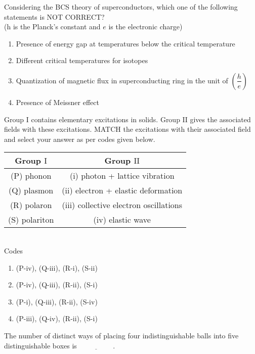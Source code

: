 \item Considering the BCS theory of superconductors, which one of the following statements is NOT CORRECT?\\
(h is the Planck's constant and $e$ is the electronic charge)

\begin{enumerate}
    \item Presence of energy gap at temperatures below the critical temperature
    \item Different critical temperatures for isotopes
    \item Quantization of magnetic flux in superconducting ring in the unit of $\left(\dfrac{h}{e}\right)$
    \item Presence of Meissner effect
\end{enumerate}

\item Group $\mathrm{I}$ contains elementary excitations in solids. Group $\mathrm{II}$ gives the associated fields with these excitations. MATCH the excitations with their associated field and select your answer as per codes given below.

\begin{tabular}{|c|c|} 
\hline
Group $\mathrm{I}$ & Group $\mathrm{II}$ \\
\hline
(P) phonon & (i) photon + lattice vibration \\
\hline
(Q) plasmon & (ii) electron + elastic deformation \\
\hline
(R) polaron & (iii) collective electron oscillations \\
\hline
(S) polariton & (iv) elastic wave \\
\hline
\end{tabular} \\

Codes 

\begin{enumerate}
    \item (P-iv), (Q-iii), (R-i), (S-ii)
    \item (P-iv), (Q-iii), (R-ii), (S-i)
    \item (P-i), (Q-iii), (R-ii), (S-iv)
    \item (P-iii), (Q-iv), (R-ii), (S-i)
\end{enumerate}

\item The number of distinct ways of placing four indistinguishable balls into five distinguishable boxes is $\underline{\hspace{2cm}}$.

